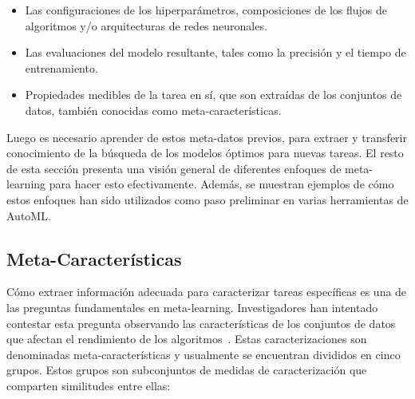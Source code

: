 \begin{itemize}
	\item Las configuraciones de los hiperparámetros, composiciones de los
    flujos de algoritmos y/o arquitecturas de redes neuronales.
	\item Las evaluaciones del modelo resultante, tales como la precisión y el
    tiempo de entrenamiento.
	\item Propiedades medibles de la tarea en sí, que son extraídas de los
    conjuntos de datos, también conocidas como meta-características.
\end{itemize}

Luego es necesario aprender de estos meta-datos previos, para extraer y
transferir conocimiento de la búsqueda de los modelos óptimos para nuevas
tareas. El resto de esta sección presenta una visión general de diferentes
enfoques de meta-learning para hacer esto efectivamente. Además, se muestran
ejemplos de cómo estos enfoques han sido utilizados como paso preliminar en
varias herramientas de AutoML.

\subsection{Meta-Características}

Cómo extraer información adecuada para caracterizar tareas específicas es una
de las preguntas fundamentales en meta-learning. Investigadores han intentado
contestar esta pregunta observando las características de los conjuntos de datos
que afectan el rendimiento de los algoritmos~. Estas
caracterizaciones son denominadas meta-características y usualmente se
encuentran divididos en cinco grupos. Estos grupos son subconjuntos de medidas
de caracterización  que comparten similitudes
entre ellas:

